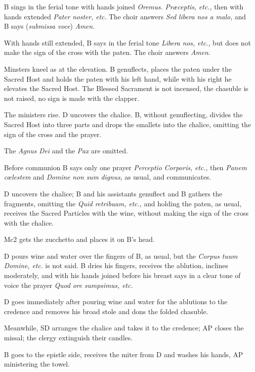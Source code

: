 {\rubric B sings in the ferial tone with hands joined \textit{Oremus. Præceptis,
etc.,} then with hands extended \textit{Pater noster, etc.} The choir answers
\textit{Sed libera nos a malo,} and B says (\textit{submissa voce})
\textit{Amen.}

\rubric With hands still extended, B says in the ferial tone \textit{Libera
nos, etc.,} but does not make the sign of the cross with the paten. The choir
answers \textit{Amen.}

\rubric Minsters kneel as at the elevation. B genuflects, places the paten
under the Sacred Host and holds the paten with his left hand, while with his
right he elevates the Sacred Host. The Blessed Sacrament is not incensed, the
chasuble is not raised, no sign is made with the clapper.

\rubric The ministers rise. D uncovers the chalice. B, without genuflecting,
divides the Sacred Host into three parts and drops the smallets into the
chalice, omitting the sign of the cross and the prayer.

\rubric The \textit{Agnus Dei} and the \textit{Pax} are omitted.

\rubric Before communion B says only one prayer \textit{Perceptio Corporis,
etc.,} then \textit{Panem cœlestem} and \textit{Domine non sum dignus,} as
usual, and communicates.

\rubric D uncovers the chalice; B and his assistants genuflect and B gathers
the fragments, omitting the \textit{Quid retribuam, etc.,} and holding the
paten, as usual, receives the Sacred Particles with the wine, without making
the sign of the cross with the chalice.

\rubric Mc2 gets the zucchetto and places it on B's head.

\rubric D pours wine and water over the fingers of B, as usual, but the
\textit{Corpus tuum Domine, etc.} is not said. B dries his fingers, receives
the ablution, inclines moderately, and with his hands joined before his breast
says in a clear tone of voice the prayer \textit{Quod ore sumpsimus, etc.}

\rubric D goes immediately after pouring wine and water for the ablutions to
the credence and removes his broad stole and dons the folded chasuble.

\rubric Meanwhile, SD arranges the chalice and takes it to the credence; AP
closes the missal; the clergy extinguish their candles.

\rubric B goes to the epistle side, receives the miter from D and washes his
hands, AP ministering the towel.

}
